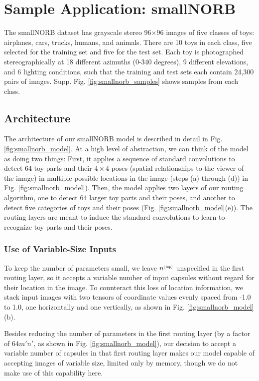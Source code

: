 \documentclass[11pt,a4paper]{article}
\begin{document}
\section{Sample Application: smallNORB}
\label{sec:smallNORB_discussion}

The smallNORB dataset \cite{LeCun:2004:LMG:1896300.1896315} has grayscale stereo 96$\times$96 images of five classes of toys: airplanes, cars, trucks, humans, and animals. There are 10 toys in each class, five selected for the training set and five for the test set. Each toy is photographed stereographically at 18 different azimuths (0-340 degrees), 9 different elevations, and 6 lighting conditions, such that the training and test sets each contain 24,300 pairs of images. Supp. Fig. \ref{fig:smallnorb_samples} shows samples from each class.

\subsection{Architecture}

The architecture of our smallNORB model is described in detail in Fig. \ref{fig:smallnorb_model}. At a high level of abstraction, we can think of the model as doing two things: First, it applies a sequence of standard convolutions to detect 64 toy parts and their $4 \times 4$ poses (spatial relationships to the viewer of the image) in multiple possible locations in the image (steps (a) through (d)) in Fig. \ref{fig:smallnorb_model}). Then, the model applies two layers of our routing algorithm, one to detect 64 larger toy parts and their poses, and another to detect five categories of toys and their poses (Fig. \ref{fig:smallnorb_model}(e)). The routing layers are meant to induce the standard convolutions to learn to recognize toy parts and their poses.

\subsubsection{Use of Variable-Size Inputs}

To keep the number of parameters small, we leave $n^{{\scriptscriptstyle\tt (inp)}}$ unspecified in the first routing layer, so it accepts a variable number of input capsules without regard for their location in the image. To counteract this loss of location information, we stack input images with two tensors of coordinate values evenly spaced from -1.0 to 1.0, one horizontally and one vertically, as shown in Fig. \ref{fig:smallnorb_model}(b).

Besides reducing the number of parameters in the first routing layer (by a factor of $64m'n'$, as shown in Fig. \ref{fig:smallnorb_model}), our decision to accept a variable number of capsules in that first routing layer makes our model capable of accepting images of variable size, limited only by memory, though we do not make use of this capability here.
\end{document}

